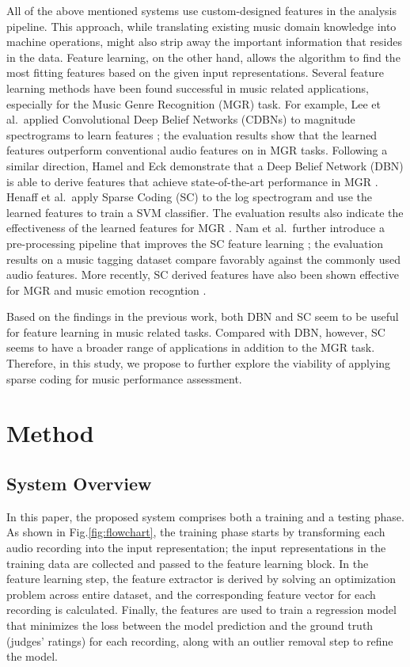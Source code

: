 \documentclass[conference]{IEEEtran}
\begin{document}
All of the above mentioned systems use custom-designed features in the analysis pipeline. This approach, while translating existing music domain knowledge into machine operations, might also strip away the important information that resides in the data. Feature learning, on the other hand, allows the algorithm to find the most fitting features based on the given input representations. Several feature learning methods have been found successful in music related applications, especially for the Music Genre Recognition (MGR) task. For example, Lee et al.\  applied Convolutional Deep Belief Networks (CDBNs) to magnitude spectrograms to learn features \cite{Lee2009a}; the evaluation results show that the learned features outperform conventional audio features on in MGR tasks. Following a similar direction, Hamel and Eck demonstrate that a Deep Belief Network (DBN) is able to derive features that achieve state-of-the-art performance in MGR \cite{Hamel2010}. 
Henaff et al.\  apply Sparse Coding (SC) to the log spectrogram and use the learned features to train a SVM classifier. The evaluation results also indicate the effectiveness of the learned features for MGR \cite{Henaff2011}. Nam et al.\  further introduce a pre-processing pipeline that improves the SC feature learning \cite{Nam2012}; the evaluation results on a music tagging dataset compare favorably against the commonly used audio features. More recently, SC derived features have also been shown effective for MGR \cite{Hsu2016} and music emotion recogntion \cite{OBrien2015}. 

Based on the findings in the previous work, both DBN and SC seem to be useful for feature learning in music related tasks. Compared with DBN, however, SC seems to have a broader range of applications in addition to the MGR task. Therefore, in this study, we propose to further explore the viability of applying sparse coding for music performance assessment.

\section{Method}\label{sec:method}
\subsection{System Overview}
In this paper, the proposed system comprises both a training and a testing phase. As shown in Fig.\ref{fig:flowchart}, the training phase starts by transforming each audio recording into the input representation; the input representations in the training data are collected and passed to the feature learning block. In the feature learning step, the feature extractor is derived by solving an optimization problem across entire dataset, and the corresponding feature vector for each recording is calculated. Finally, the features are used to train a regression model that minimizes the loss between the model prediction and the ground truth (judges' ratings) for each recording, along with an outlier removal step to refine the model. 
\end{document}
